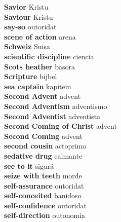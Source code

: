 \textbf{ Savior  } Kristu \\
\textbf{ Saviour  } Kristu \\
\textbf{ say-so  } outoridat \\
\textbf{ scene of action  } arena \\
\textbf{ Schweiz  } Suisa \\
\textbf{ scientific discipline  } ciencia \\
\textbf{ Scots heather  } basora \\
\textbf{ Scripture  } bijbel \\
\textbf{ sea captain  } kapitein \\
\textbf{ Second Advent  } advent \\
\textbf{ Second Adventism  } adventismo \\
\textbf{ Second Adventist  } adventista \\
\textbf{ Second Coming of Christ  } advent \\
\textbf{ Second Coming  } advent \\
\textbf{ second cousin  } actoprimo \\
\textbf{ sedative drug  } calmante \\
\textbf{ see to it  } sigurá \\
\textbf{ seize with teeth  } morde \\
\textbf{ self-assurance  } outoridat \\
\textbf{ self-conceited  } banidoso \\
\textbf{ self-confidence  } outoridat \\
\textbf{ self-direction  } outonomia \\
